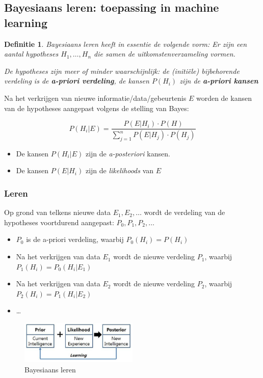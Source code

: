 \documentclass{article}
\newtheorem{theorem}{Definitie}[section]
\begin{document}
\subsection{Bayesiaans leren: toepassing in machine learning}

\begin{theorem}
    Bayesiaans leren heeft in essentie de volgende vorm: Er zijn een aantal hypotheses $H_1, \dots, H_n$ die samen de uitkomstenverzameling vormen.

    De hypotheses zijn meer of minder waarschijnlijk: de (initiële) bijbehorende verdeling is de \textbf{a-priori verdeling}, de kansen
    $P(H_i)$ zijn de \textbf{a-priori kansen}
\end{theorem}

Na het verkrijgen van nieuwe informatie/data/gebeurtenis $E$ worden de kansen van de hypotheses aangepast volgens de stelling van Bayes:

\begin{equation}
    P(H_i | E) = \frac{P(E | H_i) \cdot P(H)}{\sum_{j=1}^n P(E | H_j) \cdot P(H_j)}
\end{equation}


\begin{itemize}
    \item De kansen $P(H_i | E)$ zijn de \textit{a-posteriori} kansen. 
    \item De kansen $P(E | H_i)$ zijn de \textit{likelihoods} van $E$
\end{itemize}

\subsubsection{Leren}

Op grond van telkens nieuwe data $E_1, E_2, \dots$ wordt de verdeling van de hypotheses voortdurend aangepast: $P_0, P_1, P_2, \dots$

\begin{itemize}
    \item $P_0$ is de a-priori verdeling, waarbij $P_0(H_i) = P(H_i)$
    \item Na het verkrijgen van data $E_1$ wordt de nieuwe verdeling $P_1$, waarbij $P_1(H_i) = P_0(H_i | E_1)$
    \item Na het verkrijgen van data $E_2$ wordt de nieuwe verdeling $P_2$, waarbij $P_2(H_i) = P_1(H_i | E_2)$
    \item \dots
\end{itemize}


\begin{figure}[H]
    \centering
    \includegraphics[width=0.5\textwidth]{bayesiaans-leren.png}
    \caption{Bayesiaans leren}
\end{figure}
\end{document}
